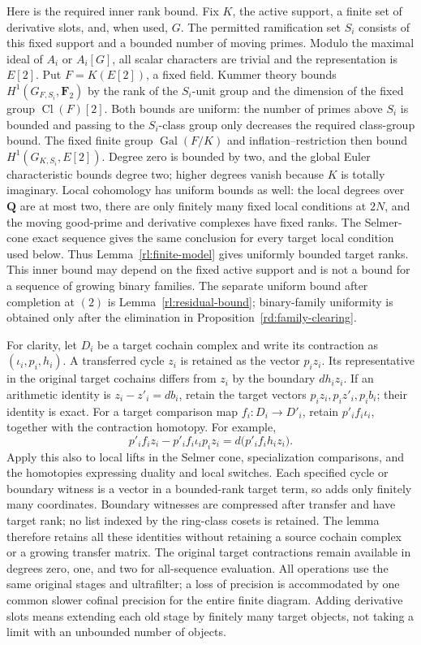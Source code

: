 Here is the required inner rank bound.  Fix \(K\), the active support,
a finite set of derivative slots, and, when used, \(G\).  The permitted
ramification set \(S_i\) consists of this fixed support and a bounded
number of moving primes.  Modulo the maximal ideal of \(A_i\) or
\(A_i[G]\), all scalar characters are trivial and the representation is
\(E[2]\).  Put \(F=K(E[2])\), a fixed field.  Kummer theory bounds
\(H^1(G_{F,S_i},\mathbf F_2)\) by the rank of the \(S_i\)-unit group
and the dimension of the fixed group \(\operatorname{Cl}(F)[2]\).
Both bounds are uniform: the number of primes above \(S_i\) is bounded
and passing to the \(S_i\)-class group only decreases the required
class-group bound.  The fixed finite group
\(\operatorname{Gal}(F/K)\) and inflation--restriction then bound
\(H^1(G_{K,S_i},E[2])\).  Degree zero is bounded by two, and the global
Euler characteristic bounds degree two; higher degrees vanish because
\(K\) is totally imaginary.  Local cohomology has uniform bounds as
well: the local degrees over \(\mathbf Q\) are at most two, there are
only finitely many fixed local conditions at \(2N\), and the moving
good-prime and derivative complexes have fixed ranks.  The Selmer-cone
exact sequence gives the same conclusion for every target local
condition used below.  Thus Lemma~\ref{rl:finite-model} gives uniformly
bounded target ranks.  This inner bound may depend on the fixed active
support and is not a bound for a sequence of growing binary families.
The separate uniform bound after completion at \((2)\) is
Lemma~\ref{rl:residual-bound}; binary-family uniformity is obtained only
after the elimination in Proposition~\ref{rd:family-clearing}.

For clarity, let \(D_i\) be a target cochain complex and write its
contraction as \((\iota_i,p_i,h_i)\).  A transferred cycle \(z_i\)
is retained as the vector \(p_i z_i\).  Its representative in the
original target cochains differs from \(z_i\) by the boundary
\(d h_i z_i\).  If an arithmetic identity is
\(z_i-z'_i=d b_i\), retain the target vectors
\(p_i z_i,p_i z'_i,p_i b_i\); their identity is exact.  For a target
comparison map \(f_i:D_i\to D'_i\), retain
\(p'_i f_i\iota_i\), together with the contraction homotopy.  For
example,
\[
 p'_i f_i z_i-p'_i f_i\iota_i p_i z_i
       =d\bigl(p'_i f_i h_i z_i\bigr).
\]
Apply this also to local lifts in the Selmer cone, specialization
comparisons, and the homotopies expressing duality and local switches.
Each specified cycle or boundary witness is a vector in a bounded-rank
target term, so adds only finitely many coordinates.  Boundary witnesses
are compressed after transfer and have target rank; no list indexed by
the ring-class cosets is retained.  The lemma therefore retains all
these identities without retaining a source cochain complex or a
growing transfer matrix.  The original target contractions remain
available in degrees zero, one, and two for all-sequence evaluation.
All operations use the same original stages and ultrafilter; a loss of
precision is accommodated by one common slower cofinal precision for
the entire finite diagram.  Adding derivative slots means extending
each old stage by finitely many target objects, not taking a limit with
an unbounded number of objects.

